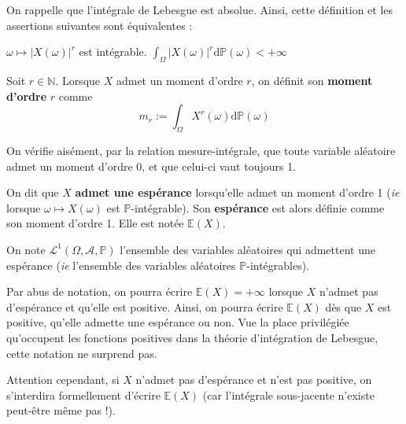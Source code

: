\documentclass[../integ-proba.tex]{subfiles}
\begin{document}
\begin{rem}
    On rappelle que l'intégrale de Lebesgue est absolue. Ainsi, cette définition et les assertions suivantes sont équivalentes :
    \begin{itemize}
        \itemb $\omega \mapsto \left|X(\omega)\right|^r$ est intégrable.
        \itemb $\displaystyle \int_\Omega\left|X(\omega)\right|^r\text{d}\mathbb{P}(\omega) < +\infty$
    \end{itemize}
\end{rem}

\begin{defi}
    Soit $r\in\mathbb{N}$. Lorsque $X$ admet un moment d'ordre $r$, on définit son \textbf{moment d'ordre } $r$ comme
    $$m_r := \int_\Omega X^r(\omega)\text{d}\mathbb{P}(\omega)$$
\end{defi}

\begin{rem}
    On vérifie aisément, par la relation mesure-intégrale, que toute variable aléatoire admet un moment d'ordre 0, et que celui-ci vaut toujours 1.
\end{rem}

\begin{defi}
    On dit que $X$ \textbf{admet une espérance} lorsqu'elle admet un moment d'ordre 1 (\textit{ie} lorsque $\omega \mapsto X\left(\omega\right)$ est $\mathbb{P}$-intégrable).
    Son \textbf{espérance} est alors définie comme son moment d'ordre 1.
    Elle est notée $\mathbb{E}(X)$.

    On note $\mathcal{L}^1\left(\Omega, \mathcal{A}, \mathbb{P}\right)$ l'ensemble des variables aléatoires qui admettent une espérance (\textit{ie} l'ensemble des variables aléatoires $\mathbb{P}$-intégrables).
\end{defi}

\begin{rem}
    Par abus de notation, on pourra écrire $\mathbb{E}(X)=+\infty$ lorsque $X$ n'admet pas d'espérance et qu'elle est positive.
    Ainsi, on pourra écrire $\mathbb{E}(X)$ dès que $X$ est positive, qu'elle admette une espérance ou non.
    Vue la place privilégiée qu'occupent les fonctions positives dans la théorie d'intégration de Lebesgue, cette notation ne surprend pas.
    
    Attention cependant, si $X$ n'admet pas d'espérance et n'est pas positive, on s'interdira formellement d'écrire $\mathbb{E}(X)$ (car l'intégrale sous-jacente n'existe peut-être même pas !).
\end{rem}
\end{document}
